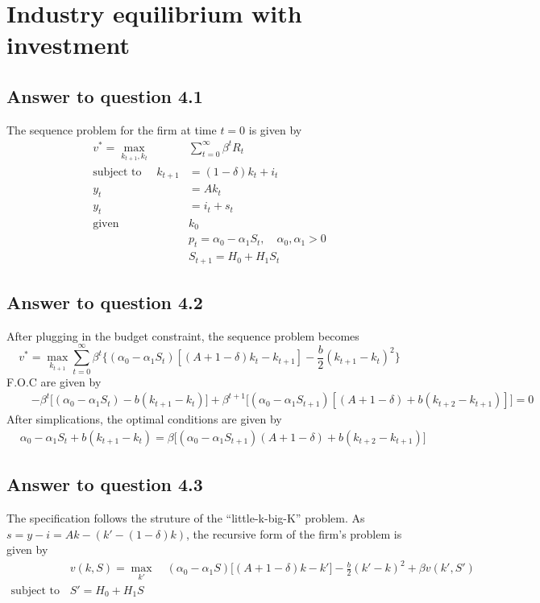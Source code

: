 \documentclass[11pt]{article}
\theoremstyle{definition}
\theoremstyle{boldtitle} %
\numberwithin{equation}{section}
\numberwithin{figure}{section}
\numberwithin{table}{section}
\begin{document}
\section{Industry equilibrium with investment}
\subsection*{Answer to question 4.1}
The sequence problem for the firm at time $t = 0$ is given by 
\begin{align*}
v^* = \max_{k_{t+1}, k_t} \quad &  \sum_{t=0}^{\infty} \beta^t R_t \\ 
    \text{subject to } \quad k_{t+1} & = (1 - \delta)k_t + i_t \\ 
    y_t & = A k_t \\ 
    y_t & = i_t + s_t \\ 
    \text{given } & k_0 \\ 
    & p_t = \alpha_0 - \alpha_1 S_t, \quad \alpha_0, \alpha_1 > 0 \\
    & S_{t+1} = H_0 + H_1 S_t
\end{align*}

\subsection*{Answer to question 4.2}
After plugging in the budget constraint, the sequence problem becomes 
\[
v^* = \max_{k_{t+1}} \sum_{t=0}^{\infty} \beta^t 
    \bigg\{ (\alpha_0 - \alpha_1 S_t) [(A+1 - \delta) k_t - k_{t+1}] - \frac{b}{2}(k_{t+1} - k_t)^2
    \bigg\}
\]
\noindent F.O.C are given by 
\begin{align*}
    [k_{t+1}] \quad & - \beta^t \bigg[(\alpha_0 - \alpha_1 S_t) - b(k_{t+1} - k_t) \bigg]+ \beta^{t+1} \bigg[ (\alpha_0 - \alpha_1 S_{t+1}) \left[(A+1 -\delta) + b(k_{t+2} - k_{t+1})\right]\bigg] = 0
\end{align*}
After simplications, the optimal conditions are given by 
\begin{align*}
    & \alpha_0 - \alpha_1 S_t + b(k_{t+1} - k_t)  =  \beta \bigg[(\alpha_0 - \alpha_1 S_{t+1}) (A+1 -\delta) + b(k_{t+2} - k_{t+1})\bigg]
\end{align*}
\subsection*{Answer to question 4.3}
The specification follows the struture of the ``little-k-big-K'' problem.
As $s = y - i = Ak - (k' - (1 - \delta)k)$, 
the recursive form of the firm's problem is given by
\begin{equation}
    \label{eqn:equilibrium_firm_bellman}
    \begin{aligned}
        & v(k, S) = \max_{k'} \quad (\alpha_0 - \alpha_1 S) \bigg[(A + 1 - \delta)k - k'\bigg] - \frac{b}{2} \left(k' - k \right)^2 + \beta v(k', S') \\
        \text{subject to } \quad & S' = H_0 + H_1 S
    \end{aligned}
\end{equation}
\end{document}
